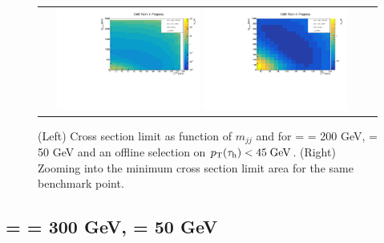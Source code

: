 \begin{figure}[tbh!]
	\centering
	\begin{tabular}{cc}
		\includegraphics[width=0.45\textwidth]{analysis/pics/JetInvMass_vs_MET_xsec_chi200_lsp050_taupt45.pdf}
		\includegraphics[width=0.45\textwidth]{analysis/pics/JetInvMass_vs_MET_xsec_chi200_lsp050_taupt45_zoom.pdf} 		
	\end{tabular}
	\caption{(Left) Cross section limit as function of $m_{jj}$ and \met for \charginopm = \neutralinotwo = 200 GeV, \neutralinoone = 50 GeV and an offline selection on $p_{\text{T}}(\tau_{\text{h}}) <  45\;\text{Ge}\kern-0.06667em\text{V}$. (Right) Zooming into the minimum cross section limit area for the same benchmark point.}
	\label{fig::JetInvMass_vs_MET_xsec_chi200_lsp050_taupt45}
\end{figure}

\FloatBarrier

\subsection*{\charginopm = \neutralinotwo = 300 GeV, \neutralinoone = 50 GeV}

\FloatBarrier

